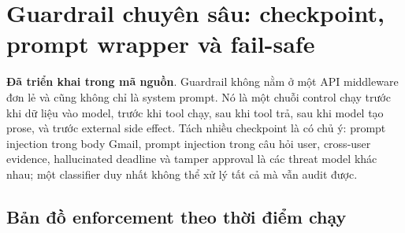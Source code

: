 \documentclass[11pt,a4paper]{article}
\newcommand{\implemented}{\textcolor{mondaiyteal}{\textbf{Đã triển khai trong mã nguồn}}}
\begin{document}
\section{Guardrail chuyên sâu: checkpoint, prompt wrapper và fail-safe}

\implemented. Guardrail không nằm ở một API middleware đơn lẻ và cũng không chỉ là system prompt. Nó là một chuỗi control chạy trước khi dữ liệu vào model, trước khi tool chạy, sau khi tool trả, sau khi model tạo prose, và trước external side effect. Tách nhiều checkpoint là có chủ ý: prompt injection trong body Gmail, prompt injection trong câu hỏi user, cross-user evidence, hallucinated deadline và tamper approval là các threat model khác nhau; một classifier duy nhất không thể xử lý tất cả mà vẫn audit được.

\subsection{Bản đồ enforcement theo thời điểm chạy}
\end{document}
